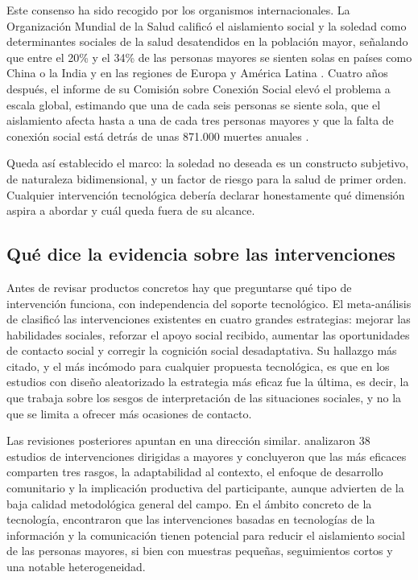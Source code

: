 Este consenso ha sido recogido por los organismos internacionales. La Organización Mundial de la Salud calificó el aislamiento social y la soledad como determinantes sociales de la salud desatendidos en la población mayor, señalando que entre el 20\% y el 34\% de las personas mayores se sienten solas en países como China o la India y en las regiones de Europa y América Latina \citep{OMS2021}. Cuatro años después, el informe de su Comisión sobre Conexión Social elevó el problema a escala global, estimando que una de cada seis personas se siente sola, que el aislamiento afecta hasta a una de cada tres personas mayores y que la falta de conexión social está detrás de unas 871.000 muertes anuales \citep{OMS2025}.

Queda así establecido el marco: la soledad no deseada es un constructo subjetivo, de naturaleza bidimensional, y un factor de riesgo para la salud de primer orden. Cualquier intervención tecnológica debería declarar honestamente qué dimensión aspira a abordar y cuál queda fuera de su alcance.

\subsection{Qué dice la evidencia sobre las intervenciones}

Antes de revisar productos concretos hay que preguntarse qué tipo de intervención funciona, con independencia del soporte tecnológico. El meta-análisis de \textcite{Masi2011} clasificó las intervenciones existentes en cuatro grandes estrategias: mejorar las habilidades sociales, reforzar el apoyo social recibido, aumentar las oportunidades de contacto social y corregir la cognición social desadaptativa. Su hallazgo más citado, y el más incómodo para cualquier propuesta tecnológica, es que en los estudios con diseño aleatorizado la estrategia más eficaz fue la última, es decir, la que trabaja sobre los sesgos de interpretación de las situaciones sociales, y no la que se limita a ofrecer más ocasiones de contacto.

Las revisiones posteriores apuntan en una dirección similar. \textcite{Gardiner2018} analizaron 38 estudios de intervenciones dirigidas a mayores y concluyeron que las más eficaces comparten tres rasgos, la adaptabilidad al contexto, el enfoque de desarrollo comunitario y la implicación productiva del participante, aunque advierten de la baja calidad metodológica general del campo. En el ámbito concreto de la tecnología, \textcite{ChenSchulz2016} encontraron que las intervenciones basadas en tecnologías de la información y la comunicación tienen potencial para reducir el aislamiento social de las personas mayores, si bien con muestras pequeñas, seguimientos cortos y una notable heterogeneidad.

